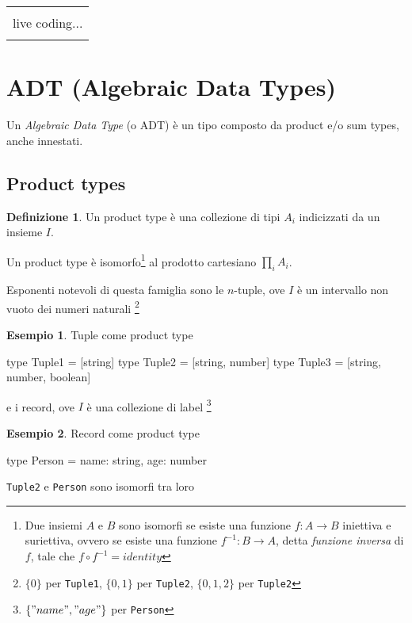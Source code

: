 \documentclass[12pt]{article}
\theoremstyle{definition}
\newtheorem{definition}{Definizione}[section]
\newtheorem{example}{Esempio}[subsection]
\newenvironment{boxed}
    {\begin{center}
    \begin{tabular}{|p{0.9\textwidth}|}
    \hline\\
    }
    {
    \\\\\hline
    \end{tabular}
    \end{center}
    }
\newenvironment{code}
  {\vspace{0.5cm} \VerbatimEnvironment\begin{typescriptcode}}
  {\end{typescriptcode} \vspace{0.2cm}}
\begin{document}
\begin{boxed}
live coding...
\end{boxed}

\newpage
\section{ADT (Algebraic Data Types)}

Un \emph{Algebraic Data Type} (o ADT) è un tipo composto da product e/o sum types, anche innestati.

\subsection{Product types}

\begin{definition}
Un product type è una collezione di tipi $A_i$ indicizzati da un insieme $I$.
\end{definition}

Un product type è isomorfo\footnote{Due insiemi $A$ e $B$ sono isomorfi se esiste una funzione $f: A \rightarrow B$ iniettiva e suriettiva,
ovvero se esiste una funzione $f^{-1}: B \rightarrow A$, detta \emph{funzione inversa} di $f$, tale che $f \circ f^{-1} = identity$}
al prodotto cartesiano $\prod_i A_i$.

Esponenti notevoli di questa famiglia sono le $n$-tuple, ove $I$ è un intervallo non vuoto dei numeri naturali
\footnote{$\{0\}$ per \texttt{Tuple1}, $\{0, 1\}$ per \texttt{Tuple2}, $\{0, 1, 2\}$ per \texttt{Tuple2}}

\begin{example}
Tuple come product type

\begin{code}
type Tuple1 = [string]
type Tuple2 = [string, number]
type Tuple3 = [string, number, boolean]
\end{code}
\end{example}

e i record, ove $I$ è una collezione di label
\footnote{$\{ "name", "age" \}$ per \texttt{Person}}

\begin{example}
Record come product type

\begin{code}
type Person = {
  name: string,
  age: number
}
\end{code}
\end{example}

\texttt{Tuple2} e \texttt{Person} sono isomorfi tra loro
\end{document}
